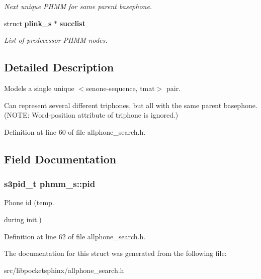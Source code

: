 \begin{DoxyCompactItemize}
\begin{DoxyCompactList}\small\item\em Next unique P\+H\+M\+M for same parent basephone. \end{DoxyCompactList}\item 
struct {\bf plink\+\_\+s} $\ast$ {\bf succlist}\label{structphmm__s_a152d26f99b39098c8027cd2d8372e05c}

\begin{DoxyCompactList}\small\item\em List of predecessor P\+H\+M\+M nodes. \end{DoxyCompactList}\end{DoxyCompactItemize}


\subsection{Detailed Description}
Models a single unique $<$senone-\/sequence, tmat$>$ pair. 

Can represent several different triphones, but all with the same parent basephone. (N\+O\+T\+E\+: Word-\/position attribute of triphone is ignored.) 

Definition at line 60 of file allphone\+\_\+search.\+h.



\subsection{Field Documentation}
\subsubsection[{pid}]{\setlength{\rightskip}{0pt plus 5cm}s3pid\+\_\+t phmm\+\_\+s\+::pid}\label{structphmm__s_aee52956004053c676230cd8567366b60}


Phone id (temp. 

during init.) 

Definition at line 62 of file allphone\+\_\+search.\+h.



The documentation for this struct was generated from the following file\+:\begin{DoxyCompactItemize}
\item 
src/libpocketsphinx/allphone\+\_\+search.\+h\end{DoxyCompactItemize}
